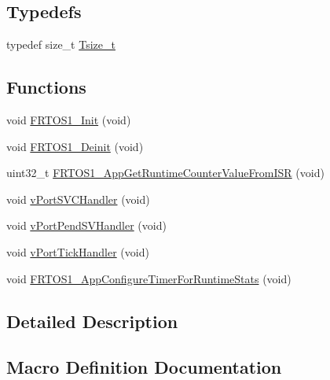 \subsection*{Typedefs}
\begin{DoxyCompactItemize}
\item 
typedef size\+\_\+t \hyperlink{group___f_r_t_o_s1__module_ga978b77c999725d30847a41f218210fd5}{Tsize\+\_\+t}
\end{DoxyCompactItemize}
\subsection*{Functions}
\begin{DoxyCompactItemize}
\item 
void \hyperlink{group___f_r_t_o_s1__module_gaa6736fa261f845b8f407ca839b14c340}{F\+R\+T\+O\+S1\+\_\+\+Init} (void)
\item 
void \hyperlink{group___f_r_t_o_s1__module_gae59cd6cf4cfc95ca846900a4c8341760}{F\+R\+T\+O\+S1\+\_\+\+Deinit} (void)
\item 
uint32\+\_\+t \hyperlink{group___f_r_t_o_s1__module_gab1438703d0c195f86363fd284f256948}{F\+R\+T\+O\+S1\+\_\+\+App\+Get\+Runtime\+Counter\+Value\+From\+I\+SR} (void)
\item 
void \hyperlink{group___f_r_t_o_s1__module_ga859e86b6143d6bc4cf96b2867f408c75}{v\+Port\+S\+V\+C\+Handler} (void)
\item 
void \hyperlink{group___f_r_t_o_s1__module_ga511c6a9f325400e54badcc5d912d2917}{v\+Port\+Pend\+S\+V\+Handler} (void)
\item 
void \hyperlink{group___f_r_t_o_s1__module_ga1f0fdb64040c66499e4e087bed8b2c90}{v\+Port\+Tick\+Handler} (void)
\item 
void \hyperlink{group___f_r_t_o_s1__module_gaec4d75a40722a373e88bd57c4e899940}{F\+R\+T\+O\+S1\+\_\+\+App\+Configure\+Timer\+For\+Runtime\+Stats} (void)
\end{DoxyCompactItemize}


\subsection{Detailed Description}


\subsection{Macro Definition Documentation}
\mbox{\label{group___f_r_t_o_s1__module_gac3c1de9aa16951baa6a82649a5708f0a}} 
